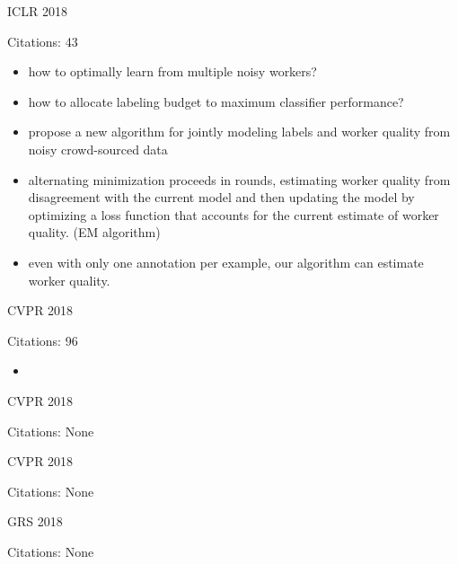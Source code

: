 \documentclass[11pt]{article}
\begin{document}
\vspace{2cm}

\noindent ICLR 2018

\noindent Citations: 43

\begin{itemize}
\item how to optimally learn from multiple noisy workers?
\item how to allocate labeling budget to maximum classifier performance?
\item propose a new algorithm for jointly modeling labels and worker quality from noisy crowd-sourced data
\item alternating minimization proceeds in rounds, estimating worker quality from disagreement with the current model and then updating the model by optimizing a loss function that accounts for the current estimate of worker quality. (EM algorithm)
\item even with only one annotation per example, our algorithm can estimate worker quality.
\end{itemize}

\vspace{2cm}

\noindent CVPR 2018

\noindent Citations: 96

\begin{itemize}
\item 
\end{itemize}

\vspace{2cm}

\noindent CVPR 2018

\noindent Citations: None

\vspace{2cm}

\noindent CVPR 2018

\noindent Citations: None

\vspace{2cm}

\noindent GRS 2018

\noindent Citations: None
\end{document}
